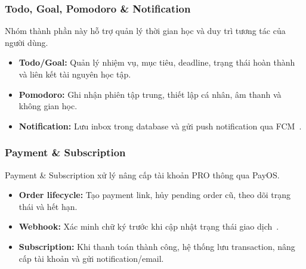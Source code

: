 \subsubsection{Todo, Goal, Pomodoro \& Notification}
\label{subsubsec:planning-notification-component}

Nhóm thành phần này hỗ trợ quản lý thời gian học và duy trì tương tác của người dùng.

\begin{itemize}
    \item \textbf{Todo/Goal:} Quản lý nhiệm vụ, mục tiêu, deadline, trạng thái hoàn thành và liên kết tài nguyên học tập.
    \item \textbf{Pomodoro:} Ghi nhận phiên tập trung, thiết lập cá nhân, âm thanh và không gian học.
    \item \textbf{Notification:} Lưu inbox trong database và gửi push notification qua FCM~\cite{firebasefcm}.
\end{itemize}

\subsubsection{Payment \& Subscription}
\label{subsubsec:payment-subscription-component}

Payment \& Subscription xử lý nâng cấp tài khoản PRO thông qua PayOS.

\begin{itemize}
    \item \textbf{Order lifecycle:} Tạo payment link, hủy pending order cũ, theo dõi trạng thái và hết hạn.
    \item \textbf{Webhook:} Xác minh chữ ký trước khi cập nhật trạng thái giao dịch~\cite{payoswebhook}.
    \item \textbf{Subscription:} Khi thanh toán thành công, hệ thống lưu transaction, nâng cấp tài khoản và gửi notification/email.
\end{itemize}